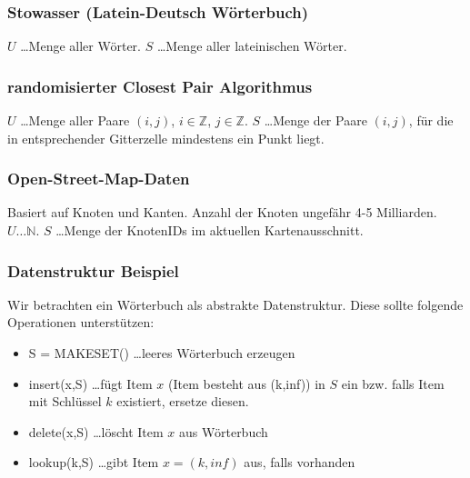 



\subsubsection{Stowasser (Latein-Deutsch Wörterbuch)}
$U$ \dots Menge aller Wörter. $S$ \dots Menge aller lateinischen Wörter.

\subsubsection{randomisierter Closest Pair Algorithmus}
$U$ \dots Menge aller Paare $(i,j)$, $i \in \mathbb{Z}$, $j \in \mathbb{Z}$. $S$ \dots Menge der Paare $(i,j)$, für die in entsprechender Gitterzelle mindestens ein Punkt liegt.

\subsubsection{Open-Street-Map-Daten}
Basiert auf Knoten und Kanten. Anzahl der Knoten ungefähr 4-5 Milliarden. $U \dots \mathbb{N}$. $S$ \dots Menge der KnotenIDs im aktuellen Kartenausschnitt.


\subsubsection{Datenstruktur Beispiel}
Wir betrachten ein Wörterbuch als abstrakte Datenstruktur. Diese sollte folgende Operationen unterstützen:
\begin{itemize}
	\item[] S = MAKESET() \dots leeres Wörterbuch erzeugen
	\item[] insert(x,S) \dots fügt Item $x$ (Item besteht aus (k,inf)) in $S$ ein bzw. falls Item mit Schlüssel $k$ existiert, ersetze diesen.
	\item[] delete(x,S) \dots löscht Item $x$ aus Wörterbuch
	\item[] lookup(k,S) \dots gibt Item $x = (k,inf)$ aus, falls vorhanden
\end{itemize}


